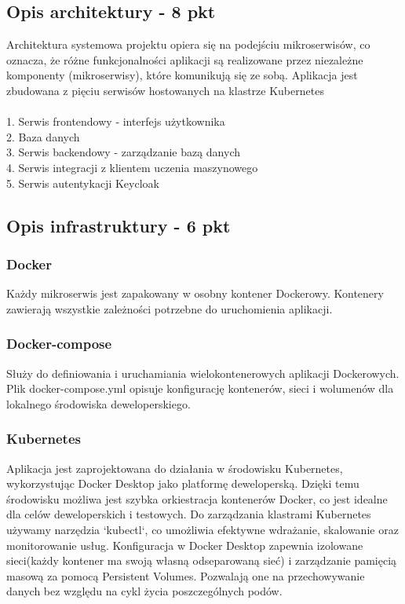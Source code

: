 \documentclass[12pt,a4paper]{article}
\begin{document}
\subsection{Opis architektury - 8 pkt}
\label{sec:introduction}
Architektura systemowa projektu opiera się na podejściu mikroserwisów, co oznacza, że różne funkcjonalności aplikacji są realizowane przez niezależne komponenty (mikroserwisy), które komunikują się ze sobą. Aplikacja jest zbudowana z pięciu serwisów hostowanych na klastrze Kubernetes \\
    \\
    1. Serwis frontendowy - interfejs użytkownika \\
    2. Baza danych \\
    3. Serwis backendowy - zarządzanie bazą danych\\
    4. Serwis integracji z klientem uczenia maszynowego \\
    5. Serwis autentykacji Keycloak \\

\subsection{Opis infrastruktury - 6 pkt}
\label{sec:Users}

\subsubsection{Docker}
Każdy mikroserwis jest
zapakowany w osobny kontener Dockerowy. Kontenery zawierają wszystkie
zależności potrzebne do uruchomienia aplikacji.
\subsubsection{Docker-compose} 
Służy do definiowania i uruchamiania wielokontenerowych
aplikacji Dockerowych. Plik docker-compose.yml opisuje konfigurację
kontenerów, sieci i wolumenów dla lokalnego środowiska deweloperskiego.
\subsubsection{Kubernetes} 
Aplikacja jest zaprojektowana do działania w środowisku Kubernetes, wykorzystując Docker Desktop jako platformę deweloperską. Dzięki temu środowisku możliwa jest szybka orkiestracja kontenerów Docker, co jest idealne dla celów deweloperskich i testowych. Do zarządzania klastrami Kubernetes używamy narzędzia `kubectl`, co umożliwia efektywne wdrażanie, skalowanie oraz monitorowanie usług. Konfiguracja w Docker Desktop zapewnia izolowane sieci(każdy kontener ma swoją własną odseparowaną sieć) i zarządzanie pamięcią masową za pomocą Persistent Volumes. Pozwalają one na przechowywanie danych bez względu na cykl życia poszczególnych podów. 
\end{document}
